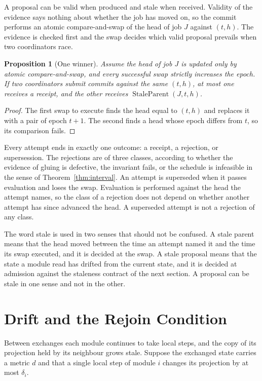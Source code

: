 \documentclass[11pt,openany]{book}
\theoremstyle{plain}
\newtheorem{proposition}[theorem]{Proposition}
\theoremstyle{definition}
\theoremstyle{remark}
\begin{document}
A proposal can be valid when produced and stale when received. Validity of the evidence says nothing about whether the job has moved on, so the commit performs an atomic compare-and-swap of the head of job $J$ against $(t,h)$. The evidence is checked first and the swap decides which valid proposal prevails when two coordinators race.

\begin{proposition}[One winner]
\label{prop:onewinner}
Assume the head of job $J$ is updated only by atomic compare-and-swap, and every successful swap strictly increases the epoch. If two coordinators submit commits against the same $(t,h)$, at most one receives a receipt, and the other receives $\operatorname{StaleParent}(J,t,h)$.
\end{proposition}
\begin{proof}
The first swap to execute finds the head equal to $(t,h)$ and replaces it with a pair of epoch $t+1$. The second finds a head whose epoch differs from $t$, so its comparison fails.
\end{proof}

Every attempt ends in exactly one outcome: a receipt, a rejection, or supersession. The rejections are of three classes, according to whether the evidence of gluing is defective, the invariant fails, or the schedule is infeasible in the sense of Theorem~\ref{thm:interval}. An attempt is superseded when it passes evaluation and loses the swap. Evaluation is performed against the head the attempt names, so the class of a rejection does not depend on whether another attempt has since advanced the head. A superseded attempt is not a rejection of any class.

The word stale is used in two senses that should not be confused. A stale parent means that the head moved between the time an attempt named it and the time its swap executed, and it is decided at the swap. A stale proposal means that the state a module read has drifted from the current state, and it is decided at admission against the staleness contract of the next section. A proposal can be stale in one sense and not in the other.

\section{Drift and the Rejoin Condition}

Between exchanges each module continues to take local steps, and the copy of its projection held by its neighbour grows stale. Suppose the exchanged state carries a metric $d$ and that a single local step of module $i$ changes its projection by at most $\delta_i$.
\end{document}
